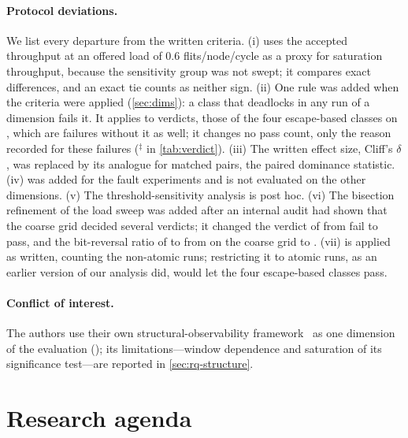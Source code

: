 \paragraph{Protocol deviations.} We list every departure from the written criteria. (i)  uses the accepted throughput at an offered load of 0.6 flits/node/cycle as a proxy for saturation throughput, because the sensitivity group was not swept; it compares exact differences, and an exact tie counts as neither sign. (ii) One rule was added when the criteria were applied (\cref{sec:dims}): a class that deadlocks in any run of a dimension fails it. It applies to  verdicts, those of the four escape-based classes on , which are failures without it as well; it changes no pass count, only the reason recorded for these failures ($^{\ddagger}$ in \cref{tab:verdict}). (iii) The written effect size, Cliff's $\delta$, was replaced by its analogue for matched pairs, the paired dominance statistic. (iv)  was added for the fault experiments and is not evaluated on the other dimensions. (v) The threshold-sensitivity analysis is post hoc. (vi) The bisection refinement of the load sweep was added after an internal audit had shown that the coarse grid decided several  verdicts; it changed the  verdict of  from fail to pass, and the bit-reversal ratio of  to  from  on the coarse grid to . (vii)  is applied as written, counting the non-atomic runs; restricting it to atomic runs, as an earlier version of our analysis did, would let the four escape-based classes pass.

\paragraph{Conflict of interest.} The authors use their own structural-observability framework~\cite{mesellem2026era} as one dimension of the evaluation (); its limitations---window dependence and saturation of its significance test---are reported in \cref{sec:rq-structure}.

\section{Research agenda}
\label{sec:agenda}

